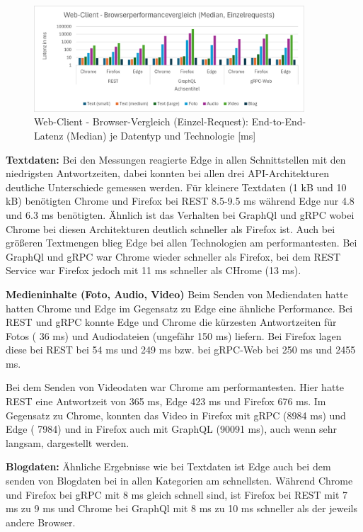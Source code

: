 \begin{figure}[htbp]
	\centering
	\includegraphics[width=0.9\textwidth]{images/Browserperformance.png}
	\caption{Web-Client - Browser-Vergleich (Einzel-Request): End-to-End-Latenz (Median) je Datentyp und Technologie [ms]}
	\label{fig:webclient-browser-comparison}
\end{figure}

\textbf{Textdaten:}  
Bei den Messungen reagierte Edge in allen Schnittstellen mit den niedrigsten Antwortzeiten, dabei konnten bei allen drei API-Architekturen deutliche Unterschiede gemessen werden. Für kleinere Textdaten (1 kB und 10 kB) benötigten Chrome und Firefox bei REST 8.5-9.5 ms während Edge nur 4.8 und 6.3 ms benötigten. Ähnlich ist das Verhalten bei GraphQl und gRPC wobei Chrome bei diesen Architekturen deutlich schneller als Firefox ist. Auch bei größeren Textmengen blieg Edge bei allen Technologien am performantesten. Bei GraphQl und gRPC war Chrome wieder schneller als Firefox, bei dem REST Service war Firefox jedoch mit 11 ms schneller als CHrome (13 ms).


\textbf{Medieninhalte (Foto, Audio, Video)}  
Beim Senden von Mediendaten hatte hatten Chrome und Edge im Gegensatz zu Edge eine ähnliche Performance. Bei REST und gRPC konnte Edge und Chrome die kürzesten Antwortzeiten für Fotos ( 36 ms) und Audiodateien (ungefähr 150 ms)  liefern. Bei Firefox lagen diese bei REST bei 54 ms und 249 ms bzw. bei gRPC-Web bei 250 ms und 2455 ms.

Bei dem Senden von Videodaten war Chrome am performantesten. Hier hatte REST eine Antwortzeit von 365 ms, Edge 423 ms und Firefox 676 ms. Im Gegensatz zu Chrome, konnten das Video in Firefox mit gRPC (8984 ms) und Edge ( 7984) und in Firefox auch mit GraphQL (90091 ms), auch wenn sehr langsam, dargestellt werden.


\textbf{Blogdaten:}  
Ähnliche Ergebnisse wie bei Textdaten ist Edge auch bei dem senden von Blogdaten bei in allen Kategorien am schnellsten. Während Chrome und Firefox bei gRPC mit 8 ms gleich schnell sind, ist Firefox bei REST mit 7 ms zu 9 ms und Chrome bei GraphQl mit 8 ms zu 10 ms schneller als der jeweils andere Browser.


